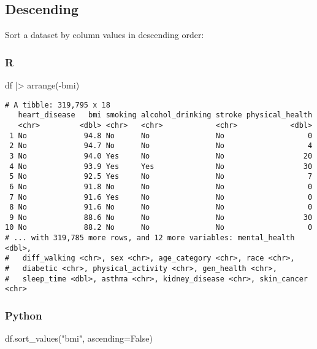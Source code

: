 \documentclass[
  letterpaper,
  DIV=11,
  numbers=noendperiod]{scrreprt}
\newenvironment{Shaded}{\begin{snugshade}}{\end{snugshade}}
\newcommand{\FunctionTok}[1]{\textcolor[rgb]{0.28,0.35,0.67}{#1}}
\newcommand{\NormalTok}[1]{\textcolor[rgb]{0.00,0.46,0.62}{#1}}
\newcommand{\OperatorTok}[1]{\textcolor[rgb]{0.37,0.37,0.37}{#1}}
\newcommand{\SpecialCharTok}[1]{\textcolor[rgb]{0.37,0.37,0.37}{#1}}
\newcommand{\StringTok}[1]{\textcolor[rgb]{0.13,0.47,0.30}{#1}}
\newcommand{\VariableTok}[1]{\textcolor[rgb]{0.07,0.07,0.07}{#1}}
\begin{document}
\hypertarget{descending}{%
\subsection{Descending}\label{descending}}

Sort a dataset by column values in descending order:

\hypertarget{r-24}{%
\subsubsection{R}\label{r-24}}

\begin{Shaded}
\begin{Highlighting}[]
\NormalTok{df }\SpecialCharTok{|\textgreater{}} \FunctionTok{arrange}\NormalTok{(}\SpecialCharTok{{-}}\NormalTok{bmi)}
\end{Highlighting}
\end{Shaded}

\begin{verbatim}
# A tibble: 319,795 x 18
   heart_disease   bmi smoking alcohol_drinking stroke physical_health
   <chr>         <dbl> <chr>   <chr>            <chr>            <dbl>
 1 No             94.8 No      No               No                   0
 2 No             94.7 No      No               No                   4
 3 No             94.0 Yes     No               No                  20
 4 No             93.9 Yes     Yes              No                  30
 5 No             92.5 Yes     No               No                   7
 6 No             91.8 No      No               No                   0
 7 No             91.6 Yes     No               No                   0
 8 No             91.6 No      No               No                   0
 9 No             88.6 No      No               No                  30
10 No             88.2 No      No               No                   0
# ... with 319,785 more rows, and 12 more variables: mental_health <dbl>,
#   diff_walking <chr>, sex <chr>, age_category <chr>, race <chr>,
#   diabetic <chr>, physical_activity <chr>, gen_health <chr>,
#   sleep_time <dbl>, asthma <chr>, kidney_disease <chr>, skin_cancer <chr>
\end{verbatim}

\hypertarget{python-24}{%
\subsubsection{Python}\label{python-24}}

\begin{Shaded}
\begin{Highlighting}[]
\NormalTok{df.sort\_values(}\StringTok{"bmi"}\NormalTok{, ascending}\OperatorTok{=}\VariableTok{False}\NormalTok{)}
\end{Highlighting}
\end{Shaded}
\end{document}
